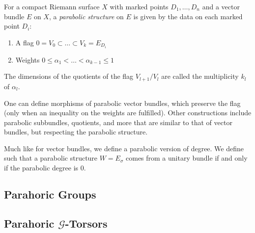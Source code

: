 \begin{definition}
For a compact Riemann surface $X$ with marked points $D_1,\ldots,D_n$ and a vector bundle $E$ on $X$, a \textit{parabolic structure} on $E$ is given by the data on each marked point $D_i$:
\begin{enumerate}[label=(\alph*)]
    \item A flag $0=V_0\subset\ldots\subset V_k=E_{D_i}$
    \item Weights $0\leq\alpha_1<\ldots<\alpha_{k-1}\leq1$
\end{enumerate}
The dimensions of the quotients of the flag $V_{l+1}/V_{l}$ are called the multiplicity $k_l$ of $\alpha_l$.
\end{definition}

One can define morphisms of parabolic vector bundles, which preserve the flag (only when an inequality on the weights are fulfilled). Other constructions include parabolic subbundles, quotients, and more that are similar to that of vector bundles, but respecting the parabolic structure.

Much like for vector bundles, we define a parabolic version of degree. We define such that a parabolic structure $W=E_\sigma$ comes from a unitary bundle if and only if the parabolic degree is $0$.

\begin{definition}

\end{definition}

\subsection{Parahoric Groups}

\subsection{Parahoric $\mathcal{G}$-Torsors}